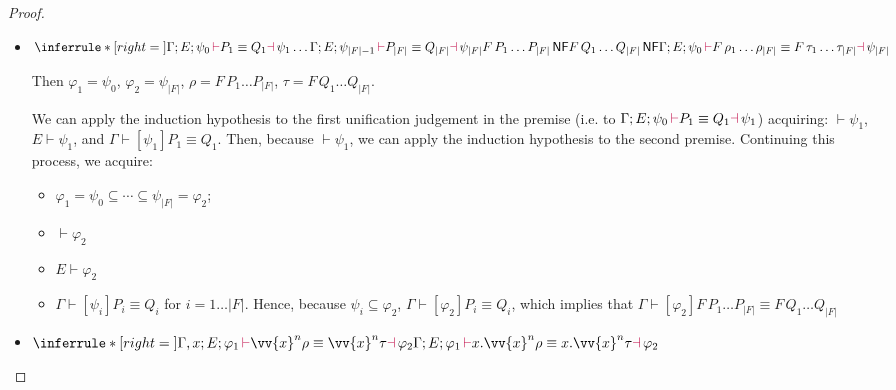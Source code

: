\documentclass[a4,natbib=false]{article}
\newcommand{\ctxtapp}[2]{[{#1}] {#2}}
\newcommand{\narg}[1]{|{#1}|}
\newcommand{\judgectx}[2]{{#1} \vdash {#2}}
\newcommand{\judgeequivuntg}[3]{{#1} \vdash {#2} \equiv {#3}}
\newcommand{\judgeunify}[4]{{#1}\,{\color{purple}\vdash} {#2} \equiv {#3} {\color{purple}\dashv}\,{#4}}
\newcommand{\judgeSnf}[1]{{#1}\,\mathsf{NF}}
\newcommand{\absclose}[2]{\vv{x}^{#1} #2}
\newcommand{\fullterm}[2]{{#1}\,#2_1 \dots #2_{\narg{#1}}}
\newcommand{\Infer}[3]{\inferrule*[right={#1}]{#2}{#3}}
\begin{document}
\begin{proof}
\begin{itemize}
    \item
      $
      \Infer{}
      {
        \judgeunify{\Gamma; E;\psi_0}{P_1}{Q_1}{\psi_1} \\
        \dots\\
        \judgeunify{\Gamma; E;\psi_{\narg{F}-1}}{P_{\narg{F}}}{Q_{\narg{F}}}{\psi_{\narg{F}}} \\
        \judgeSnf{\fullterm{F}{P}} \\
        \judgeSnf{\fullterm{F}{Q}}
      }
      {
        \judgeunify{\Gamma; E; \psi_0}{\fullterm{F}{\rho}}{\fullterm{F}{\tau}}{\psi_{\narg{F}}}
      }
      $

      Then $\varphi_1 = \psi_0$, $\varphi_2 = \psi_{\narg{F}}$, $\rho =
      \fullterm{F}{P}$, $\tau = \fullterm{F}{Q}$. 

      We can apply the induction hypothesis to the first unification judgement
      in the premise (i.e. to $\judgeunify{\Gamma; E; \psi_0}{P_1}{Q_1}{\psi_1}$) acquiring:
      $\judgectx{}{\psi_1}$,
      $\judgectx{E}{\psi_1}$,
      and
      $\judgeequivuntg{\Gamma}{\ctxtapp{\psi_1}{P_1}}{Q_1}$. Then, because
      $\judgectx{}{\psi_1}$, we can apply the induction hypothesis to the second
      premise. Continuing this process, we acquire:
      \begin{itemize}
        \item
          $\varphi_1 = \psi_0 \subseteq \cdots \subseteq \psi_{\narg{F}} = \varphi_2$;
        \item
          $\judgectx{}{\varphi_2}$
        \item
          $\judgectx{E}{\varphi_2}$
        \item $\judgeequivuntg{\Gamma}{\ctxtapp{\psi_i}{P_i}}{Q_i}$ for $i =
          1\dots\narg{F}$. Hence, because $\psi_i \subseteq \varphi_2$,
          $\judgeequivuntg{\Gamma}{\ctxtapp{\varphi_2}{P_i}}{Q_i}$, which implies
          that $\judgeequivuntg{\Gamma}{\ctxtapp{\varphi_2}{\fullterm{F}{P}}}{\fullterm{F}{Q}}$
      \end{itemize}

      \item
        $
        \Infer{}
        {
          \judgeunify{\Gamma, x; E; \varphi_1}
          {\absclose{n}{\rho}}
          {\absclose{n}{\tau}}
          {\varphi_2}
        }
        {
          \judgeunify{\Gamma; E; \varphi_1}
          {x.\absclose{n}{\rho}}
          {x.\absclose{n}{\tau}}
          {\varphi_2}
        }
      $


\end{itemize}
\end{proof}
\end{document}
